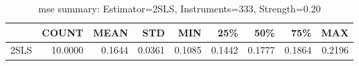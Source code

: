 \begin{table}[ht]
\centering
\caption{mse summary: Estimator=2SLS, Instruments=333, Strength=0.20}
\begin{tabular}{lrrrrrrrr}
\toprule
 & COUNT & MEAN & STD & MIN & 25\% & 50\% & 75\% & MAX \\
\midrule
2SLS & 10.0000 & 0.1644 & 0.0361 & 0.1085 & 0.1442 & 0.1777 & 0.1864 & 0.2196 \\
\bottomrule
\end{tabular}
\end{table}
